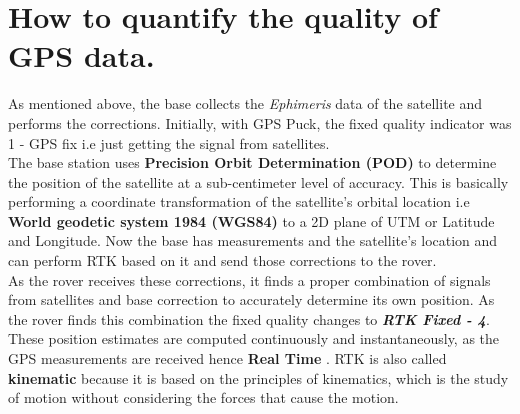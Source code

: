 \documentclass[a4paper]{article}
\begin{document}
\section{How to quantify the quality of GPS data.}
As mentioned above, the base collects the \textit{Ephimeris} data of the satellite and performs the corrections. Initially, with GPS Puck, the fixed quality indicator was 1 - GPS fix i.e just getting the signal from satellites.\\ The base station uses \textbf{Precision Orbit Determination (POD)} to determine the position of the satellite at a sub-centimeter level of accuracy. This is basically performing a coordinate transformation of the satellite's orbital location i.e \textbf{World geodetic system 1984 (WGS84)} to a 2D plane of UTM or Latitude and Longitude. Now the base has measurements and the satellite's location and can perform RTK based on it and send those corrections to the rover.\\ As the rover receives these corrections, it finds a proper combination of signals from satellites and base correction to accurately determine its own position. As the rover finds this combination the fixed quality changes to \textbf{\textit{RTK Fixed - 4}}.\\
These position estimates are computed continuously and instantaneously, as the GPS measurements are received hence \textbf{Real Time }. RTK is also called \textbf{kinematic} because it is based on the principles of kinematics, which is the study of motion without considering the forces that cause the motion. 
\end{document}
